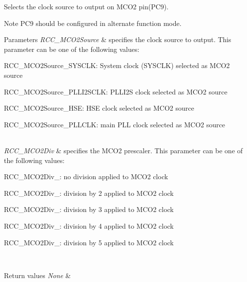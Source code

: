 Selects the clock source to output on M\+C\+O2 pin(\+P\+C9). 

\begin{DoxyNote}{Note}
P\+C9 should be configured in alternate function mode. 
\end{DoxyNote}

\begin{DoxyParams}{Parameters}
{\em R\+C\+C\+\_\+\+M\+C\+O2\+Source} & specifies the clock source to output. This parameter can be one of the following values\+: \begin{DoxyItemize}
\item R\+C\+C\+\_\+\+M\+C\+O2\+Source\+\_\+\+S\+Y\+S\+C\+LK\+: System clock (S\+Y\+S\+C\+LK) selected as M\+C\+O2 source \item R\+C\+C\+\_\+\+M\+C\+O2\+Source\+\_\+\+P\+L\+L\+I2\+S\+C\+LK\+: P\+L\+L\+I2S clock selected as M\+C\+O2 source \item R\+C\+C\+\_\+\+M\+C\+O2\+Source\+\_\+\+H\+SE\+: H\+SE clock selected as M\+C\+O2 source \item R\+C\+C\+\_\+\+M\+C\+O2\+Source\+\_\+\+P\+L\+L\+C\+LK\+: main P\+LL clock selected as M\+C\+O2 source \end{DoxyItemize}
\\
\hline
{\em R\+C\+C\+\_\+\+M\+C\+O2\+Div} & specifies the M\+C\+O2 prescaler. This parameter can be one of the following values\+: \begin{DoxyItemize}
\item R\+C\+C\+\_\+\+M\+C\+O2\+Div\+\_\+: no division applied to M\+C\+O2 clock \item R\+C\+C\+\_\+\+M\+C\+O2\+Div\+\_\+: division by 2 applied to M\+C\+O2 clock \item R\+C\+C\+\_\+\+M\+C\+O2\+Div\+\_\+: division by 3 applied to M\+C\+O2 clock \item R\+C\+C\+\_\+\+M\+C\+O2\+Div\+\_\+: division by 4 applied to M\+C\+O2 clock \item R\+C\+C\+\_\+\+M\+C\+O2\+Div\+\_\+: division by 5 applied to M\+C\+O2 clock \end{DoxyItemize}
\\
\hline
\end{DoxyParams}

\begin{DoxyRetVals}{Return values}
{\em None} & \\
\hline
\end{DoxyRetVals}
